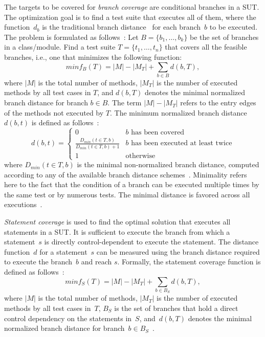 \documentclass[paper=a4,%
  twoside,%
  BCOR4mm,%
  abstract=true,%
  toc=bibliography,%
  chapterprefix=true,%
  toc=bibliographynumbered,%
  open=right,%
  english,%
  pagesize=pdftex]{scrreprt}
\newcommand{\sut}{\ac{SUT}\xspace}
\begin{document}
The targets to be covered for \emph{branch coverage} are conditional branches in a \sut. The optimization goal is to find a test suite that executes all of them, where the function~$d_b$ is the traditional branch distance~\cite{Pacheco_2007} for each branch~$b$ to be executed. The problem is formulated as follows~\cite{Fraser2014}: Let $B = \{b_1, \dots, b_k\}$ be the set of branches in a class/module. Find a test suite $T = \{t_1, \dots, t_n\}$ that covers all the feasible branches, i.e., one that minimizes the following function:
\begin{equation}
minf_B(T) = \left|M\right| - \left|M_T\right| + \sum_{b \in B}{d(b, T)},
\end{equation}
where $\left|M\right|$ is the total number of methods, $\left|M_T\right|$ is the number of executed methods by all test cases in $T$, and $d(b, T)$ denotes the minimal normalized branch distance for branch $b \in B$. The term $\left|M\right| - \left|M_T\right|$ refers to the entry edges of the methods not executed by $T$. The minimum normalized branch distance $d(b, t)$ is defined as follows~\cite{Fraser_2013}:
\begin{equation}
d(b, t) = \left\{ \begin{array}{cl}
0 & b \textrm{ has been covered} \\
\frac{D_{min}(t \in T, b)}{D_{min}(t \in T, b) + 1} & b \textrm{ has been executed at least twice} \\
1 & \textrm{otherwise}
\end{array} \right.
\end{equation}
where $D_{min}(t \in T, b)$ is the minimal non-normalized branch distance, computed according to any of the available branch distance schemes~\cite{McMinn_2004}. Minimality refers here to the fact that the condition of a branch can be executed multiple times by the same test or by numerous tests. The minimal distance is favored across all executions~\cite{Panichella2018}.

\emph{Statement coverage} is used to find the optimal solution that executes all statements in a \sut. It is sufficient to execute the branch from which a statement~$s$ is directly control-dependent to execute the statement. The distance function~$d$ for a statement~$s$ can be measured using the branch distance required to execute the branch~$b$ and reach $s$. Formally, the statement coverage function is defined as follows~\cite{Fraser_2013}:
\begin{equation}
minf_S(T) = \left|M\right| - \left|M_T\right| + \sum_{b \in B_S}{d(b, T)},
\end{equation}
where $\left|M\right|$ is the total number of methods, $\left|M_T\right|$ is the number of executed methods by all test cases in~$T$, $B_S$ is the set of branches that hold a direct control dependency on the statements in~$S$, and~$d(b, T)$ denotes the minimal normalized branch distance for branch~$b \in B_S$~\cite{Panichella2018}.
\end{document}
